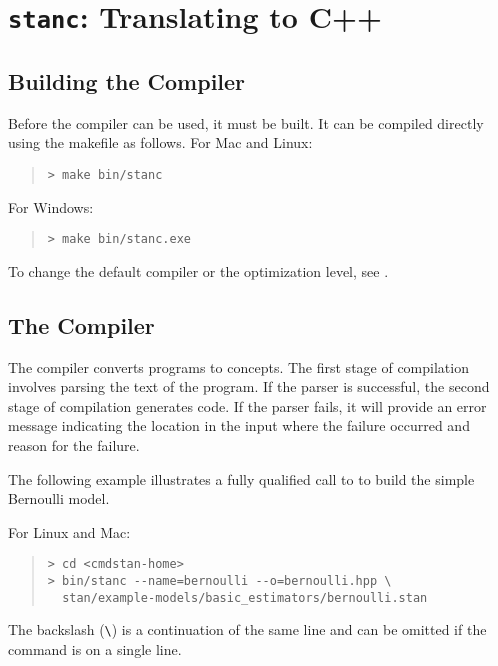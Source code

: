 \chapter{{\tt\bfseries stanc}: Translating \Stan to C++}\label{stanc.chapter}

\section{Building the \stanc Compiler}

Before the \stanc compiler can be used, it must be built. It can be
compiled directly using the makefile as follows. For Mac and Linux:
%
\begin{quote}
\begin{Verbatim}[fontshape=sl]
> make bin/stanc
\end{Verbatim}
\end{quote}
%
For Windows:
%
\begin{quote}
\begin{Verbatim}[fontshape=sl]
> make bin/stanc.exe
\end{Verbatim}
\end{quote}
%
To change the default compiler or the optimization level, see
.

\section{The \stanc Compiler}

The \stanc compiler converts \Stan programs to \Cpp concepts. The
first stage of compilation involves parsing the text of the \Stan
program.  If the parser is successful, the second stage of compilation
generates \Cpp code.  If the parser fails, it will provide an error
message indicating the location in the input where the failure
occurred and reason for the failure.

The following example illustrates a fully qualified call to \stanc
to build the simple Bernoulli model. 

For Linux and Mac:
%
\begin{quote}
\begin{Verbatim}[fontshape=sl]
> cd <cmdstan-home>
> bin/stanc --name=bernoulli --o=bernoulli.hpp \
  stan/example-models/basic_estimators/bernoulli.stan 
\end{Verbatim}
\end{quote}
%
The backslash (\Verb|\|) is a continuation of the same line and can be
omitted if the command is on a single line.

